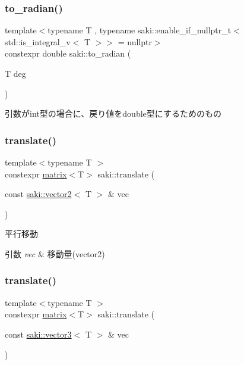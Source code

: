 \subsubsection{\texorpdfstring{to\+\_\+radian()}{to\_radian()}\hspace{0.1cm}{\footnotesize\ttfamily [2/2]}}
{\footnotesize\ttfamily template$<$typename T , typename saki\+::enable\+\_\+if\+\_\+nullptr\+\_\+t$<$ std\+::is\+\_\+integral\+\_\+v$<$ T $>$$>$  = nullptr$>$ \\
constexpr double saki\+::to\+\_\+radian (\begin{DoxyParamCaption}\item[{T}]{deg }\end{DoxyParamCaption})}



引数がint型の場合に、戻り値をdouble型にするためのもの 

\mbox{\label{namespacesaki_a2311e77a2bed9d914a6b3e8056d6023a}} 
\subsubsection{\texorpdfstring{translate()}{translate()}\hspace{0.1cm}{\footnotesize\ttfamily [1/3]}}
{\footnotesize\ttfamily template$<$typename T $>$ \\
constexpr \mbox{\hyperlink{classsaki_1_1matrix}{matrix}}$<$T$>$ saki\+::translate (\begin{DoxyParamCaption}\item[{const \mbox{\hyperlink{classsaki_1_1vector2}{saki\+::vector2}}$<$ T $>$ \&}]{vec }\end{DoxyParamCaption})}



平行移動 


\begin{DoxyParams}{引数}
{\em vec} & 移動量(vector2) \\
\hline
\end{DoxyParams}
\mbox{\label{namespacesaki_a492418470fa4dedb2065e7916460f0e0}} 
\subsubsection{\texorpdfstring{translate()}{translate()}\hspace{0.1cm}{\footnotesize\ttfamily [2/3]}}
{\footnotesize\ttfamily template$<$typename T $>$ \\
constexpr \mbox{\hyperlink{classsaki_1_1matrix}{matrix}}$<$T$>$ saki\+::translate (\begin{DoxyParamCaption}\item[{const \mbox{\hyperlink{classsaki_1_1vector3}{saki\+::vector3}}$<$ T $>$ \&}]{vec }\end{DoxyParamCaption})}



